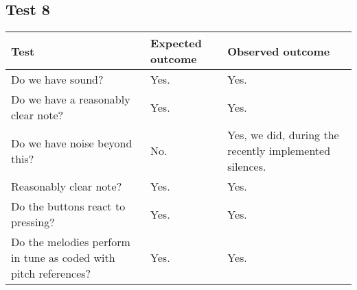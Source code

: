\subsection*{Test 8}
\begin{center}
\begin{tabular}{|p{3.6cm}|p{3.6cm}|p{3.6cm}|}
\hline
{\sc Test} & {\sc Expected outcome} & {\sc Observed outcome}\\ \hline
Do we have sound? & Yes. & Yes. \\ \hline
Do we have a reasonably clear note? & Yes. & Yes. \\ \hline
Do we have noise beyond this? & No. & Yes, we did, during the recently implemented silences. \\ \hline
Reasonably clear note? & Yes. & Yes. \\ \hline
Do the buttons react to pressing? & Yes. & Yes. \\ \hline
Do the melodies perform in tune as coded with pitch references? & Yes. &
Yes. \\ \hline
\end{tabular}
\end{center}
